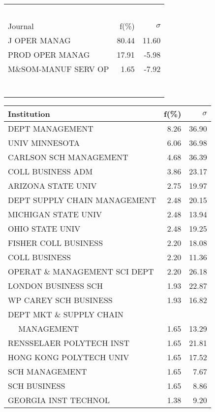 \documentclass[a4paper,11pt]{report}
\begin{document}
\begin{landscape}
\begin{table}[!ht]
{\begin{tabular}{|l r  r|}
 &  & \\
 &  & \\
 &  & \\
 &  & \\
 &  & \\
\hline
\hline
Journal & f(\%) & $\sigma$\\
\hline
J OPER MANAG & 80.44 & 11.60\\
PROD OPER MANAG & 17.91 & -5.98\\
M\&SOM-MANUF SERV OP & 1.65 & -7.92\\
 &  & \\
 &  & \\
 &  & \\
 &  & \\
 &  & \\
 &  & \\
 &  & \\
\hline
\end{tabular}
}
{\scriptsize\begin{tabular}{|l r r|}
\hline
Institution & f(\%) & $\sigma$\\
\hline
DEPT MANAGEMENT & 8.26 & 36.90\\
UNIV MINNESOTA & 6.06 & 36.98\\
CARLSON SCH MANAGEMENT & 4.68 & 36.39\\
COLL BUSINESS ADM & 3.86 & 23.17\\
ARIZONA STATE UNIV & 2.75 & 19.97\\
DEPT SUPPLY CHAIN MANAGEMENT & 2.48 & 20.15\\
MICHIGAN STATE UNIV & 2.48 & 13.94\\
OHIO STATE UNIV & 2.48 & 19.25\\
FISHER COLL BUSINESS & 2.20 & 18.08\\
COLL BUSINESS & 2.20 & 11.36\\
OPERAT \& MANAGEMENT SCI DEPT & 2.20 & 26.18\\
LONDON BUSINESS SCH & 1.93 & 22.87\\
WP CAREY SCH BUSINESS & 1.93 & 16.82\\
DEPT MKT \& SUPPLY CHAIN &  & \\
$\quad$ MANAGEMENT & 1.65 & 13.29\\
RENSSELAER POLYTECH INST & 1.65 & 21.81\\
HONG KONG POLYTECH UNIV & 1.65 & 17.52\\
SCH MANAGEMENT & 1.65 & 7.67\\
SCH BUSINESS & 1.65 & 8.86\\
GEORGIA INST TECHNOL & 1.38 & 9.20\\

\end{tabular}}
\end{table}
\end{landscape}
\end{document}
